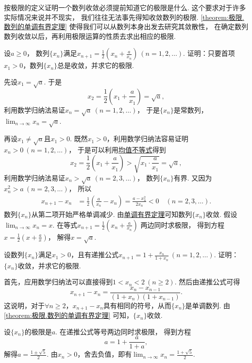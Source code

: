 按极限的定义证明一个数列收敛必须提前知道它的极限是什么.
这个要求对于许多实际情况来说并不现实，
我们往往无法事先得知收敛数列的极限.
\cref{theorem:极限.数列的单调有界定理} 使得我们可以从数列本身出发去研究其敛散性，
在确定数列数列收敛以后，再利用极限运算的性质去求出相应的极限.

\begin{example}
设\(a\geq0\)，
数列\(\{x_n\}\)满足\(x_{n+1} = \frac12\left(x_n+\frac{a}{x_n}\right)\ (n=1,2,\dotsc)\).
证明：只要首项\(x_1>0\)，数列\(\{x_n\}\)总是收敛，并求它的极限.
\begin{solution}
先设\(x_1=\sqrt{a}\).
于是\[
	x_2 = \frac12 \left(x_1+\frac{a}{x_1}\right)
	= \sqrt{a},
\]
利用数学归纳法易证\(x_n = \sqrt{a}\ (n=1,2,\dotsc)\)，
于是\(\{x_n\}\)是常数列，
\(\lim_{n\to\infty} x_n = \sqrt{a}\).

再设\(x_1\neq\sqrt{a}\)且\(x_1>0\).
既然\(x_1>0\)，利用数学归纳法容易证明\(x_n>0\ (n=1,2,\dotsc)\)，
于是可以利用\hyperref[theorem:不等式.基本不等式2推论]{均值不等式}得到\[
	x_2
	= \frac12\left(x_1+\frac{a}{x_1}\right)
	> \sqrt{x_1 \cdot \frac{a}{x_1}}
	= \sqrt{a},
\]
利用数学归纳法易证\(x_n > \sqrt{a}\ (n=2,3,\dotsc)\)，
数列\(\{x_n\}\)有界.
又因为\(x_n^2 > a\ (n=2,3,\dotsc)\)，
所以\begin{align*}
	x_{n+1}-x_n
	&= \frac12 \left(\frac{a}{x_n}-x_n\right)
	= \frac{a-x_n^2}{2x_n}
	< 0
	\quad(n=2,3,\dotsc).
\end{align*}
数列\(\{x_n\}\)从第二项开始严格单调减少.
由\hyperref[theorem:极限.数列的单调有界定理]{单调有界定理}可知数列\(\{x_n\}\)收敛.
假设\(\lim_{n\to\infty} x_n = x\).
在等式\(x_{n+1} = \frac12\left(x_n+\frac{a}{x_n}\right)\)
两边同时求极限，
得到方程\(x = \frac12\left(x+\frac{a}{x}\right)\)，
解得\(x = \sqrt{a}\).
\end{solution}
\end{example}

\begin{example}
设数列\(\{x_n\}\)满足\(x_1>0\)，且有递推公式\(x_{n+1}=1+\frac{x_n}{1+x_n}\ (n=1,2,\dotsc)\).
证明：\(\{x_n\}\)收敛，并求它的极限.
\begin{solution}
首先，应用数学归纳法可以直接得到\(1<x_n<2\ (n\geq2)\).
然后由递推公式可得\[
	x_{n+1}-x_n = \frac{x_n-x_{n-1}}{(1+x_n)(1+x_{n-1})}.
\]
这说明，对于\(\forall n\geq2\)，\(x_{n+1}-x_n\)具有相同的符号，从而\(\{x_n\}\)是单调数列.
由\cref{theorem:极限.数列的单调有界定理} 可知，\(\{x_n\}\)收敛.

设\(\{x_n\}\)的极限是\(a\).
在递推公式等号两边同时求极限，
得到方程\[
	a = 1 + \frac{a}{1+a},
\]
解得\(a = \frac{1\pm\sqrt5}2\).
由\(x_n>0\)，舍去负值，即有\(\lim_{n\to\infty} x_n = \frac{1+\sqrt5}2\).
\end{solution}
\end{example}

